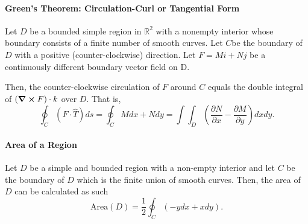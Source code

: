 \documentclass[12pt, letterpaper]{article}
\begin{document}
    \paragraph{Green's Theorem: Circulation-Curl or Tangential Form}
    Let \(D\) be a bounded simple region in \(\mathbb{R}^2\) with a nonempty interior
    whose boundary consists of a finite number of smooth curves.
    Let \(C\)be the boundary of \(D\) with a positive (counter-clockwise) direction.
    Let \(F=Mi+Nj\) be a continuously different boundary vector field on D.
    
    Then, the counter-clockwise circulation of \(F\) around \(C\) equals the double
    integral of \((\curl F)\cdot k\) over \(D\).
    That is,
    \[
        \oint_C (F\cdot \hat{T}) ds =      
        \oint_C Mdx + Ndy = 
        \int\int_D  \left(\frac{\partial N}{\partial x} - \frac{\partial M}{\partial y}\right) dx dy.
    \]

    \paragraph{Area of a Region}
    Let \(D\) be a simple and bounded region with a non-empty interior and let \(C\)
    be the boundary of \(D\) which is the finite union of smooth curves.
    Then, the area of \(D\) can be calculated as such
    \[
    \text{Area}(D) = \frac{1}{2} \oint_C \left(-y dx + xdy\right).
    \]

    

    
    
    
    \section{}
\end{document}
